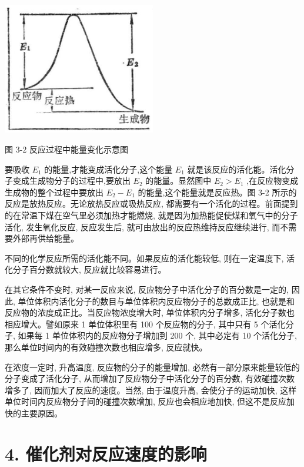 \documentclass[10pt]{article}
\begin{document}
\begin{center}
\includegraphics[max width=0.5\textwidth]{images/01912d13-9986-7822-a012-3f3f7be99dcb_70_696915.jpg}
\end{center}

图 3-2 反应过程中能量变化示意图

要吸收 \({E}_{1}\) 的能量,才能变成活化分子,这个能量 \({E}_{1}\) 就是该反应的活化能。活化分子变成生成物分子的过程中,要放出 \({E}_{2}\) 的能量。显然图中 \({E}_{2} > {E}_{1}\) ,在反应物变成生成物的整个过程中要放出 \({E}_{2} - {E}_{1}\) 的能量,这个能量就是反应热。图 3-2 所示的反应是放热反应。无论放热反应或吸热反应, 都需要有一个活化的过程。前面提到的在常温下煤在空气里必须加热才能燃烧, 就是因为加热能促使煤和氧气中的分子活化, 发生氧化反应, 反应发生后, 就可由放出的反应热维持反应继续进行, 而不需要外部再供给能量。

不同的化学反应所需的活化能不同。如果反应的活化能较低, 则在一定温度下, 活化分子百分数就较大, 反应就比较容易进行。

在其它条件不变时, 对某一反应来说, 反应物分子中活化分子的百分数是一定的, 因此, 单位体积内活化分子的数目与单位体积内反应物分子的总数成正比, 也就是和反应物的浓度成正比。当反应物浓度增大时, 单位体积内分子增多, 活化分子数也相应增大。譬如原来 1 单位体积里有 100 个反应物的分子, 其中只有 5 个活化分子, 如果每 1 单位体积内的反应物分子增加到 200 个, 其中必定有 10 个活化分子, 那么单位时间内的有效碰撞次数也相应增多, 反应就快。

在浓度一定时, 升高温度, 反应物的分子的能量增加, 必然有一部分原来能量较低的分子变成了活化分子, 从而增加了反应物分子中活化分子的百分数, 有效碰撞次数增多了, 因而加大了反应的速度。当然, 由于温度升高, 会使分子的运动加快, 这样单位时间内反应物分子间的碰撞次数增加, 反应也会相应地加快, 但这不是反应加快的主要原因。

\section*{4. 催化剂对反应速度的影响}
\end{document}
